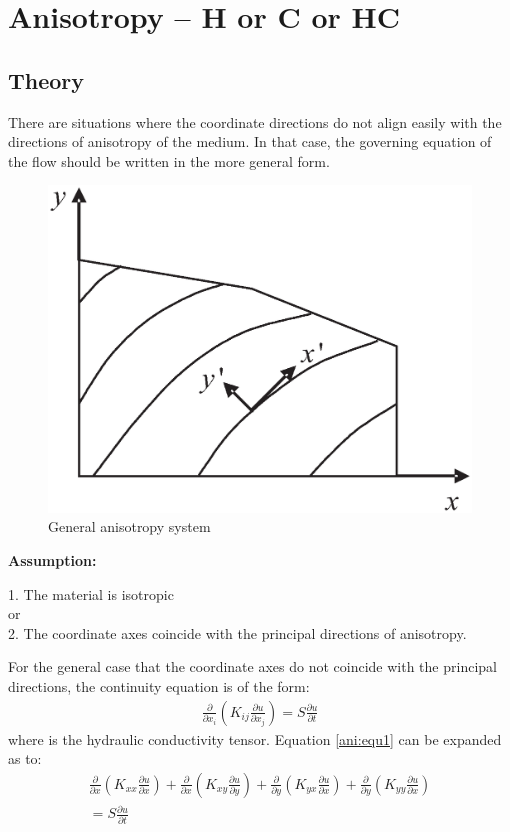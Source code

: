 \chapter{Anisotropy -- H or C or HC}

\section{Theory}
There are situations where the coordinate directions do not align easily with the directions of anisotropy of the medium. In that case, the governing equation of the flow should be written in the more general form.
\begin{figure}[H]
\centering
\includegraphics[scale=0.60]{Anisotropy/figures/generalanisotropy.eps}
\caption{General anisotropy system}
\label{GeneralAnisotropy}
\end{figure}
\textbf{Assumption:}

1. The material is isotropic \\
   or \\
2. The coordinate axes coincide with the principal directions of anisotropy. 

For the general case that the coordinate axes do not coincide with the principal directions, the continuity equation is of the form:
\begin{eqnarray}
\label{ani:equ1}
    \frac{\partial }{{\partial x_i }}\left( {K_{ij} \frac{{\partial u}}{{\partial x_j }}} \right) = S\frac{{\partial u}}{{\partial t}}
\end{eqnarray}
where   is the hydraulic conductivity tensor.  Equation \ref{ani:equ1} can be expanded as to:
\begin{eqnarray}
\label{ani:equ2}
\frac{\partial }{{\partial x}}\left( {K_{xx} \frac{{\partial u}}{{\partial x}}} \right) + \frac{\partial }{{\partial x}}\left( {K_{xy} \frac{{\partial u}}{{\partial y}}} \right) + \frac{\partial }{{\partial y}}\left( {K_{yx} \frac{{\partial u}}{{\partial x}}} \right) + \frac{\partial }{{\partial y}}\left( {K_{yy} \frac{{\partial u}}{{\partial x}}} \right) \\ = S\frac{{\partial u}}{{\partial t}\nonumber}
\end{eqnarray}

